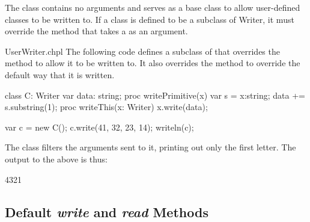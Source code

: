 The  class contains no arguments and serves as a base
class to allow user-defined classes to be written to.  If a class is
defined to be a subclass of Writer, it must override
the  method that takes a  as an argument.

\begin{chapelexample}{UserWriter.chpl}
The following code defines a subclass of  that overrides
the  method to allow it to be written to.  It also
overrides the  method to override the default way that
it is written.
\begin{chapel}
class C: Writer {
  var data: string;
  proc writePrimitive(x) {
    var s = x:string;
    data += s.substring(1);
  }
  proc writeThis(x: Writer) {
    x.write(data);
  }
}

var c = new C();
c.write(41, 32, 23, 14);
writeln(c);
\end{chapel}
The  class filters the arguments sent to it, printing out only
the first letter.  The output to the above is thus:
\begin{chapelprintoutput}
4321
\end{chapelprintoutput}
\end{chapelexample}






\subsection{Default {\em write} and {\em read} Methods}



